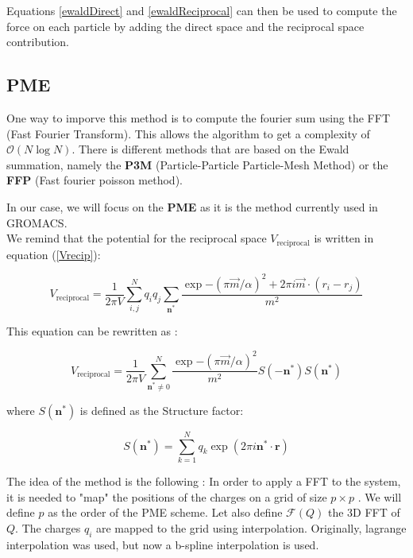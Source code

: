 \documentclass[12pt,twoside,a4paper]{report}
\begin{document}
Equations \ref{ewaldDirect} and \ref{ewaldReciprocal} can then be used to compute the force on each particle by adding the direct space and the reciprocal space contribution.\\


\subsection{PME}

One way to imporve this method is to compute the fourier sum using the FFT (Fast Fourier Transform). This allows the algorithm to get a complexity of $\mathcal{O}(N\log N)$. There is different methods that are based on the Ewald summation, namely the \textbf{P3M} (Particle-Particle Particle-Mesh Method) or the \textbf{FFP} (Fast fourier poisson method). 

In our case, we will focus on the \textbf{PME} as it is the method currently used in GROMACS. \\

We remind that the potential for the reciprocal space $V_{\text{reciprocal}}$ is written in equation (\ref{Vrecip}):


\begin{equation*}
    V_{\text{reciprocal}} =\frac{1}{2 \pi V} \sum\limits_{i,j}^{N} q_i q_j \sum\limits_{\textbf{n}^*} \frac{\exp{-(\pi \overrightarrow{m}/\alpha)^2} +2\pi i \overrightarrow{m} \cdot (r_i - r_j)}{m^2}    
\end{equation*}



This equation can be rewritten as :

\begin{equation*}
    V_{\text{reciprocal}} =\frac{1}{2 \pi V} \sum\limits_{\textbf{n}^* \neq 0}^{N}  \frac{\exp{-(\pi \overrightarrow{m}/\alpha)^2}}{m^2}S(-\textbf{n}^* )S(\textbf{n}^* )
\end{equation*}

where $S(\textbf{n}^* )$ is defined as the Structure factor:

\begin{equation}
    S(\textbf{n}^* ) = \sum\limits_{k=1}^{N} {q_k \exp(2 \pi i \textbf{n}^* \cdot \textbf{r}) }
\end{equation}


The idea of the method is the following : In order to apply a FFT to the system, it is needed to "map" the positions of the charges on a grid of size $ p \times p $ . We will define $p$ as the order of the PME scheme. Let also define $\mathcal{F}(Q)$ the 3D FFT of $Q$. The charges $q_i$ are mapped to the grid using interpolation. 
Originally, lagrange interpolation was used, but now a b-spline interpolation is used.
\end{document}
